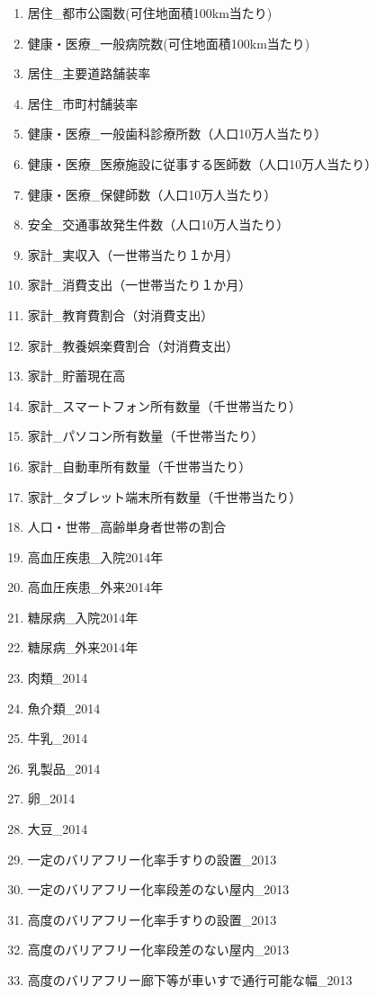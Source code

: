 \begin{enumerate}
  \item  居住\_都市公園数(可住地面積100km当たり)
  \item  健康・医療\_一般病院数(可住地面積100km当たり)
  \item  居住\_主要道路舗装率
  \item  居住\_市町村舗装率
  \item  健康・医療\_一般歯科診療所数（人口10万人当たり）
  \item  健康・医療\_医療施設に従事する医師数（人口10万人当たり）
  \item  健康・医療\_保健師数（人口10万人当たり）
  \item  安全\_交通事故発生件数（人口10万人当たり）
  \item  家計\_実収入（一世帯当たり１か月）
  \item  家計\_消費支出（一世帯当たり１か月）
  \item  家計\_教育費割合（対消費支出）
  \item  家計\_教養娯楽費割合（対消費支出）
  \item  家計\_貯蓄現在高
  \item  家計\_スマートフォン所有数量（千世帯当たり）
  \item  家計\_パソコン所有数量（千世帯当たり）
  \item  家計\_自動車所有数量（千世帯当たり）
  \item  家計\_タブレット端末所有数量（千世帯当たり）
  \item  人口・世帯\_高齢単身者世帯の割合
  \item  高血圧疾患\_入院2014年
  \item  高血圧疾患\_外来2014年
  \item  糖尿病\_入院2014年
  \item  糖尿病\_外来2014年
  \item  肉類\_2014
  \item  魚介類\_2014
  \item  牛乳\_2014
  \item  乳製品\_2014
  \item  卵\_2014
  \item  大豆\_2014
  \item  一定のバリアフリー化率手すりの設置\_2013
  \item  一定のバリアフリー化率段差のない屋内\_2013
  \item  高度のバリアフリー化率手すりの設置\_2013
  \item  高度のバリアフリー化率段差のない屋内\_2013
  \item  高度のバリアフリー廊下等が車いすで通行可能な幅\_2013

\end{enumerate}

